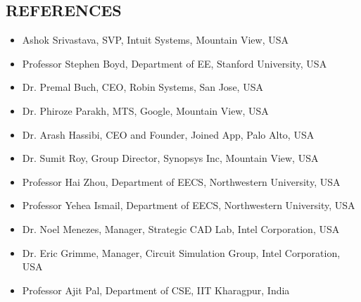 \documentclass[margin]{res}
\begin{document}
\begin{resume}
\section{REFERENCES}
\begin{itemize} \itemsep -2pt
\item Ashok Srivastava, SVP, Intuit Systems, Mountain View, USA\\
\item Professor Stephen Boyd, Department of EE, Stanford University, USA\\ 
\item Dr. Premal Buch, CEO, Robin Systems, San Jose, USA\\
\item Dr. Phiroze Parakh, MTS, Google, Mountain View, USA\\
\item Dr. Arash Hassibi, CEO and Founder, Joined App, Palo Alto, USA\\
\item Dr. Sumit Roy, Group Director, Synopsys Inc, Mountain View, USA\\
\item Professor Hai Zhou, Department of EECS, Northwestern University, USA\\
\item Professor Yehea Ismail, Department of EECS, Northwestern University, USA\\
\item Dr. Noel Menezes, Manager, Strategic CAD Lab, Intel Corporation, USA\\
\item Dr. Eric Grimme, Manager, Circuit Simulation Group, Intel Corporation, USA\\
\item Professor Ajit Pal, Department of CSE, IIT Kharagpur, India\\
\end{itemize}

\end{resume}
\end{document}
